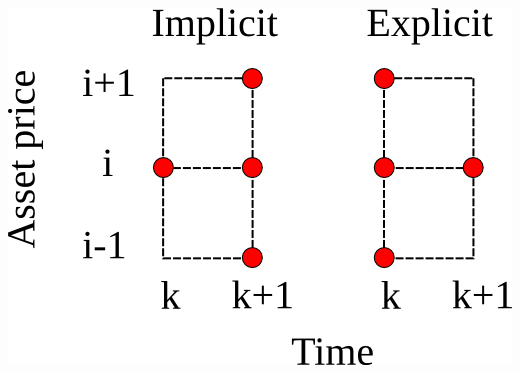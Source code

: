 \documentclass[11pt]{article} %
\begin{document}
\includegraphics[scale=0.5]{schemes.png}\\ 
\end{document}
